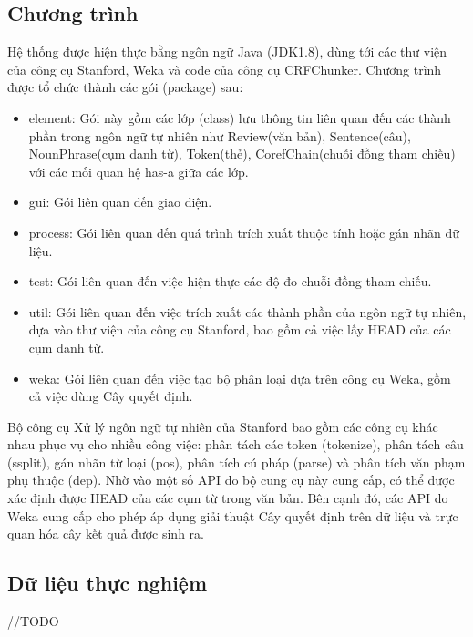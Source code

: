 \documentclass[12pt]{report}
\begin{document}
			\subsection*{Chương trình}
				\par Hệ thống được hiện thực bằng ngôn ngữ Java (JDK1.8), dùng tới các thư viện của công cụ Stanford, Weka và code của công cụ CRFChunker. Chương trình được tổ chức thành các gói (package) sau:
				\begin{itemize}
					\item{element: Gói này gồm các lớp (class) lưu thông tin liên quan đến các thành phần trong ngôn ngữ tự nhiên như Review(văn bản), Sentence(câu), NounPhrase(cụm danh từ), Token(thẻ), CorefChain(chuỗi đồng tham chiếu) với các mối quan hệ has-a giữa các lớp.}
					\item{gui: Gói liên quan đến giao diện.}
					\item{process: Gói liên quan đến quá trình trích xuất thuộc tính hoặc gán nhãn dữ liệu.}
					\item{test: Gói liên quan đến việc hiện thực các độ đo chuỗi đồng tham chiếu.}
					\item{util: Gói liên quan đến việc trích xuất các thành phần của ngôn ngữ tự nhiên, dựa vào thư viện của công cụ Stanford, bao gồm cả việc lấy HEAD của các cụm danh từ.}
					\item{weka: Gói liên quan đến việc tạo bộ phân loại dựa trên công cụ Weka, gồm cả việc dùng Cây quyết định.}
				\end{itemize}
				\par Bộ công cụ Xử lý ngôn ngữ tự nhiên của Stanford bao gồm các công cụ khác nhau phục vụ cho nhiều công việc: phân tách các token (tokenize), phân tách câu (ssplit), gán nhãn từ loại (pos), phân tích cú pháp (parse) và phân tích văn phạm phụ thuộc (dep). Nhờ vào một số API do bộ cung cụ này cung cấp, có thể được xác định được HEAD của các cụm từ trong văn bản. Bên cạnh đó, các API do Weka cung cấp cho phép áp dụng giải thuật Cây quyết định trên dữ liệu và trực quan hóa cây kết quả được sinh ra. 
			\subsection*{Dữ liệu thực nghiệm}
				//TODO
\end{document}

